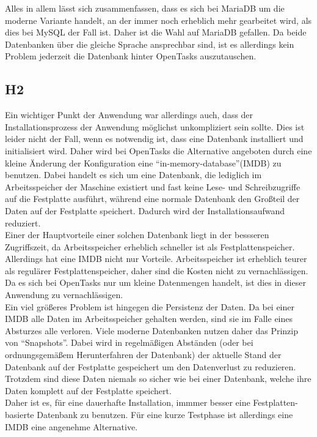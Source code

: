 Alles in allem lässt sich zusammenfassen, dass es sich bei MariaDB um die moderne Variante handelt, an der immer noch erheblich mehr gearbeitet wird, als dies bei MySQL der Fall ist. Daher ist die Wahl auf MariaDB gefallen. Da beide Datenbanken über die gleiche Sprache ansprechbar sind, ist es allerdings kein Problem jederzeit die Datenbank hinter OpenTasks auszutauschen.

\subsection{H2}

Ein wichtiger Punkt der Anwendung war allerdings auch, dass der Installationsprozess der Anwendung möglichst unkompliziert sein sollte. Dies ist leider nicht der Fall, wenn es notwendig ist, dass eine Datenbank installiert und initialisiert wird. Daher wird bei OpenTasks die Alternative angeboten durch eine kleine Änderung der Konfiguration eine ``in-memory-database''(IMDB) zu benutzen. Dabei handelt es sich um eine Datenbank, die lediglich im Arbeitsspeicher der Maschine existiert und fast keine Lese- und Schreibzugriffe auf die Festplatte ausführt, während eine normale Datenbank den Großteil der Daten auf der Festplatte speichert. Dadurch wird der Installationsaufwand reduziert. \\

Einer der Hauptvorteile einer solchen Datenbank liegt in der bessseren Zugriffszeit, da Arbeitsspeicher erheblich schneller ist als Festplattenspeicher. Allerdings hat eine IMDB nicht nur Vorteile. Arbeitsspeicher ist erheblich teurer als regulärer Festplattenspeicher, daher sind die Kosten nicht zu vernachlässigen. Da es sich bei OpenTasks nur um kleine Datenmengen handelt, ist dies in dieser Anwendung zu vernachlässigen. \\
Ein viel größeres Problem ist hingegen die Persistenz der Daten. Da bei einer IMDB alle Daten im Arbeitsspeicher gehalten werden, sind sie im Falle eines Absturzes alle verloren. Viele moderne Datenbanken nutzen daher das Prinzip von ``Snapshots''. Dabei wird in regelmäßigen Abständen (oder bei ordnungsgemäßem Herunterfahren der Datenbank) der aktuelle Stand der Datenbank auf der Festplatte gespeichert um den Datenverlust zu reduzieren. Trotzdem sind diese Daten niemals so sicher wie bei einer Datenbank, welche ihre Daten komplett auf der Festplatte speichert. \\

Daher ist es, für eine dauerhafte Installation, immmer besser eine Festplatten-basierte Datenbank zu benutzen. Für eine kurze Testphase ist allerdings eine IMDB eine angenehme Alternative.

